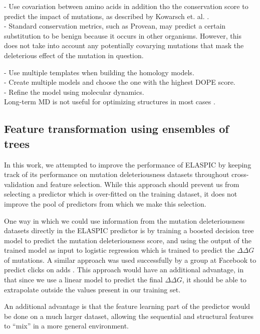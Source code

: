 
- Use covariation between amino acids in addition tho the conservation score to predict the impact of mutations, as described by Kowarsch et. al. \cite{kowarsch_correlated_2010}. \\
- Standard conservation metrics, such as Provean, may predict a certain substitution to be benign because it occurs in other organisms. However, this does not take into account any potentially covarying mutations that mask the deleterious effect of the mutation in question.



- Use multiple templates when building the homology models. \\
- Create multiple models and choose the one with the highest DOPE score. \\
- Refine the model using molecular dynamics. \\

Long-term MD is not useful for optimizing structures in most cases \cite{raval_refinement_2012}.

\subsection{Feature transformation using ensembles of trees}

In this work, we attempted to improve the performance of ELASPIC by keeping track of its performance on mutation deleteriousness datasets throughout cross-validation and feature selection. While this approach should prevent us from selecting a predictor which is over-fitted on the training dataset, it does not improve the pool of predictors from which we make this selection.

One way in which we could use information from the mutation deleteriousness datasets directly in the ELASPIC predictor is by training a boosted decision tree model to predict the mutation deleteriousness score, and using the output of the trained model as input to logistic regression which is trained to predict the $\Delta \Delta G$ of mutations. A similar approach was used successfully by a group at Facebook to predict clicks on adds \cite{he_practical_2014}. This approach would have an additional advantage, in that since we use a linear model to predict the final $\Delta \Delta G$, it should be able to extrapolate outside the values present in our training set.

An additional advantage is that the feature learning part of the predictor would be done on a much larger dataset, allowing the sequential and structural features to ``mix'' in a more general environment.

